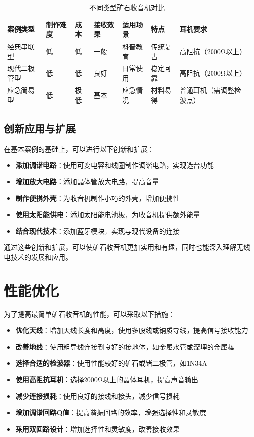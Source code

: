 \documentclass[12pt,UTF8]{ctexbook}
\begin{document}
\begin{table}[htbp]
\centering
\begin{tabular}{|l|l|l|l|l|l|l|}
\hline
案例类型 & 制作难度 & 成本 & 接收效果 & 适用场景 & 特点 & 耳机要求 \\
\hline
经典串联型 & 低 & 低 & 一般 & 科普教育 & 传统复古 & 高阻抗（2000Ω以上） \\
\hline
现代二极管型 & 低 & 低 & 良好 & 日常使用 & 稳定可靠 & 高阻抗（2000Ω以上） \\
\hline
应急简易型 & 低 & 极低 & 基本 & 应急情况 & 材料易得 & 普通耳机（需调整检波点） \\
\hline
\end{tabular}
\caption{不同类型矿石收音机对比}
\label{tab:radio_comparison}
\end{table}

\subsection{创新应用与扩展}

在基本案例的基础上，可以进行以下创新和扩展：

\begin{itemize}
  \item \textbf{添加调谐电路}：使用可变电容和线圈制作调谐电路，实现选台功能
  \item \textbf{增加放大电路}：添加晶体管放大电路，提高音量
  \item \textbf{制作便携外壳}：为收音机制作小巧的外壳，增加便携性
  \item \textbf{使用太阳能供电}：添加太阳能电池板，为收音机提供额外能量
  \item \textbf{结合现代技术}：添加蓝牙模块，实现与现代设备的连接
\end{itemize}

通过这些创新和扩展，可以使矿石收音机更加实用和有趣，同时也能深入理解无线电技术的发展和应用。

\section{性能优化}

为了提高最简单矿石收音机的性能，可以采取以下措施：
\begin{itemize}[leftmargin=3.5em]
    \item \textbf{优化天线}：增加天线长度和高度，使用多股线或铜质导线，提高信号接收能力
    \item \textbf{改善地线}：使用粗导线连接到良好的接地体，如金属水管或深埋的金属棒
    \item \textbf{选择合适的检波器}：使用性能较好的矿石或锗二极管，如1N34A
    \item \textbf{使用高阻抗耳机}：选择2000Ω以上的晶体耳机，提高声音输出
    \item \textbf{减少连接损耗}：使用良好的接线和接头，减少信号损耗
    \item \textbf{增加调谐回路Q值}：提高谐振回路的效率，增强选择性和灵敏度
    \item \textbf{采用双回路设计}：增加选择性和灵敏度，改善接收效果
\end{itemize}
\end{document}
